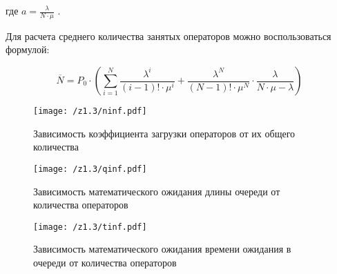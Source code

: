 где  \( a= \frac{ \lambda }{N \cdot  \mu } \) .\par

Для расчета среднего количества занятых операторов можно воспользоваться\\
формулой:\par

\begin{equation}
 \overline{N}=P_{0} \cdot  \left(  \sum _{i=1}^{N}\frac{ \lambda ^{i}}{ \left( i-1 \right) ! \cdot  \mu ^{i}}+ \frac{ \lambda ^{N}}{ \left( N-1 \right) ! \cdot  \mu ^{N}} \cdot \frac{ \lambda }{N \cdot  \mu - \lambda } \right) 
\end{equation} \par

\begin{figure}[H]
	\begin{center}
        \texttt{[image: /z1.3/ninf.pdf]}
        \caption{Зависимость коэффициента загрузки операторов от их общего количества}
	\end{center}
\end{figure}


\begin{figure}[H]
	\begin{center}
        \texttt{[image: /z1.3/qinf.pdf]}
        \caption{Зависимость математического ожидания длины очереди от количества операторов}
	\end{center}
\end{figure}

\begin{figure}[H]
	\begin{center}
        \texttt{[image: /z1.3/tinf.pdf]}
        \caption{Зависимость математического ожидания времени ожидания в очереди от количества операторов}
	\end{center}
\end{figure}

